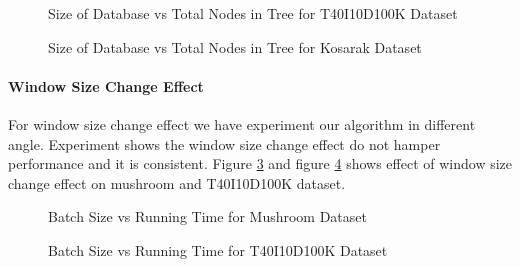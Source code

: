 		\begin{figure}[h]
		\centering
			
		\caption{Size of Database vs Total Nodes in Tree for T40I10D100K Dataset ~\cite{dataset}}
		\label{result:g_t10_const_tran_mem}
		\end{figure}
		\begin{figure}[h]
		\centering
			
		\caption{Size of Database vs Total Nodes in Tree for Kosarak Dataset ~\cite{dataset}}
		\label{result:g_k_const_tran_mem}
		\end{figure}
		
	\paragraph{Window Size Change Effect}For window size change effect we have experiment our algorithm in different angle. Experiment shows the window size change effect do not hamper performance and it is consistent. Figure \ref{result:g_m_const_batch} and figure \ref{result:g_t10_const_batch} shows effect of window size change effect on mushroom and T40I10D100K dataset.
		\begin{figure}[h]
		\centering
			
		\caption{Batch Size vs Running Time for Mushroom Dataset ~\cite{dataset}}
		\label{result:g_m_const_batch}
		\end{figure}
		\begin{figure}[h]
		\centering
			
		\caption{Batch Size vs Running Time for T40I10D100K Dataset ~\cite{dataset}}
		\label{result:g_t10_const_batch}
		\end{figure}
